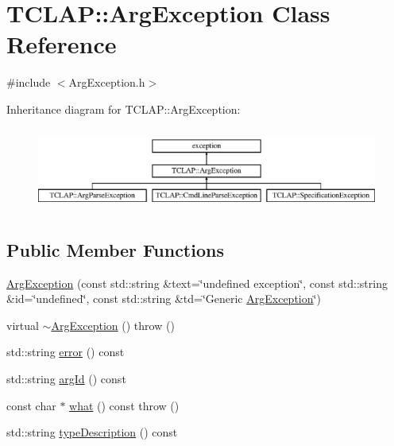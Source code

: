 \hypertarget{class_t_c_l_a_p_1_1_arg_exception}{}\section{T\+C\+L\+A\+P\+:\+:Arg\+Exception Class Reference}
\label{class_t_c_l_a_p_1_1_arg_exception}


{\ttfamily \#include $<$Arg\+Exception.\+h$>$}

Inheritance diagram for T\+C\+L\+A\+P\+:\+:Arg\+Exception\+:\begin{figure}[H]
\begin{center}
\leavevmode
\includegraphics[height=2.758621cm]{class_t_c_l_a_p_1_1_arg_exception}
\end{center}
\end{figure}
\subsection*{Public Member Functions}
\begin{DoxyCompactItemize}
\item 
\hyperlink{class_t_c_l_a_p_1_1_arg_exception_a67389912b628e95d530f8bb8de97b309}{Arg\+Exception} (const std\+::string \&text=\char`\"{}undefined exception\char`\"{}, const std\+::string \&id=\char`\"{}undefined\char`\"{}, const std\+::string \&td=\char`\"{}Generic \hyperlink{class_t_c_l_a_p_1_1_arg_exception}{Arg\+Exception}\char`\"{})
\item 
virtual \hyperlink{class_t_c_l_a_p_1_1_arg_exception_a5c5df6a814b05c623a01607fb82980f4}{$\sim$\+Arg\+Exception} ()  throw ()
\item 
std\+::string \hyperlink{class_t_c_l_a_p_1_1_arg_exception_a0656dab88a7129bc288821bacd653d08}{error} () const 
\item 
std\+::string \hyperlink{class_t_c_l_a_p_1_1_arg_exception_a18ffd1ad34c1799865f8e03df4ebdff1}{arg\+Id} () const 
\item 
const char $\ast$ \hyperlink{class_t_c_l_a_p_1_1_arg_exception_af51c89da2e4ae54fc9d05038ea484c83}{what} () const   throw ()
\item 
std\+::string \hyperlink{class_t_c_l_a_p_1_1_arg_exception_abd271955e1b808bb92f8db7a16ea7c95}{type\+Description} () const 
\end{DoxyCompactItemize}



